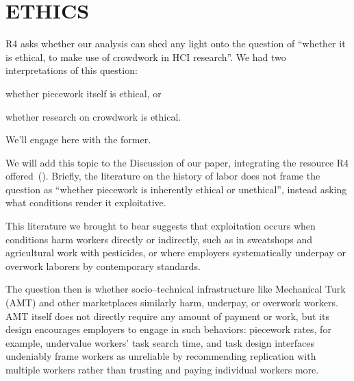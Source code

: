 \documentclass[11pt]{article}
\begin{document}
\section*{ETHICS}
R4 asks whether our analysis can shed any light onto the question of
``whether it is ethical, to make use of crowdwork in HCI research''.
We had two interpretations of this question:
\begin{inlinelist}
  \item whether piecework itself is ethical, or
  \item whether research on crowdwork is ethical. 
\end{inlinelist}
We'll engage here with the former.

We will add this topic to the Discussion of our paper,
integrating the resource R4 offered~(\cite{williamson2016}).
Briefly, the literature on the history of labor does not
frame the question as ``whether piecework is inherently ethical or unethical'',
instead asking what conditions render it exploitative.

This literature we brought to bear suggests that exploitation occurs when
conditions harm workers directly or indirectly, such as
in sweatshops and agricultural work with pesticides, or where
employers systematically underpay or overwork laborers by contemporary standards.

The question then is
whether socio--technical infrastructure like Mechanical Turk (AMT)
and other marketplaces
similarly harm, underpay, or overwork workers.
AMT itself does not directly require any amount of payment or work,
but its design encourages employers to engage in such behaviors:
piecework rates, for example, undervalue workers' task search time, and
task design interfaces undeniably frame
workers as unreliable by recommending
replication with multiple workers rather than
trusting and paying individual workers more.








\end{document}
